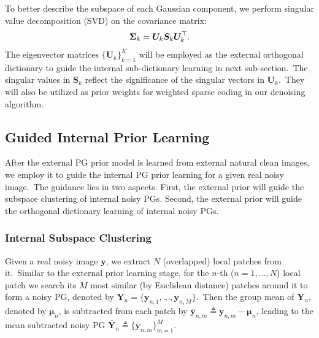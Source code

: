 To better describe the subspace of each Gaussian component, we perform singular value decomposition (SVD) \cite{eckart1936approximation} on the covariance matrix:
\vspace{-2mm}
\begin{equation}\label{equ3-2}
\vspace{-2mm}
\bm{\Sigma}_{k}=\bm{U}_{k}\bm{S}_{k}\bm{U}_{k}^{\top}.
\end{equation}
The eigenvector matrices $\{\bm{U}_{k}\}_{k=1}^{K}$ will be employed as the external orthogonal dictionary to guide the internal sub-dictionary learning in next sub-section.\ The singular values in $\bm{S}_{k}$ reflect the significance of the singular vectors in $\bm{U}_{k}$.\ They  will also be utilized as prior weights for weighted sparse coding in our denoising algorithm.


\subsection{Guided Internal Prior Learning}

After the external PG prior model is learned from external natural clean images, we employ it to guide the internal PG prior learning for a given real noisy image.\ The guidance lies in two aspects. First, the external prior will guide the subspace clustering of internal noisy PGs. Second, the external prior will guide the orthogonal dictionary learning of internal noisy PGs.

\subsubsection{Internal Subspace Clustering}

Given a real noisy image $\mathbf{y}$, we extract $N$ (overlapped) local patches from it.\ Similar to the external prior learning stage, for the $n$-th ($n=1,...,N$) local patch we search its $M$ most similar (by Euclidean distance) patches around it to form a noisy PG, denoted by $\bm{Y}_{n} = \{\mathbf{y}_{n,1},...,\mathbf{y}_{n,M}\}$.\ Then the group mean of $\bm{Y}_{n}$, denoted by $\bm{\mu}_{n}$, is subtracted from each patch by $\bm{\overline{y}}_{n,m}\triangleq\mathbf{y}_{n,m}-\bm{\mu}_{n}$, leading to the mean subtracted noisy PG $\bm{\overline{Y}}_{n}\triangleq \{\bm{\overline{y}}_{n,m}\}_{m=1}^{M}$.

